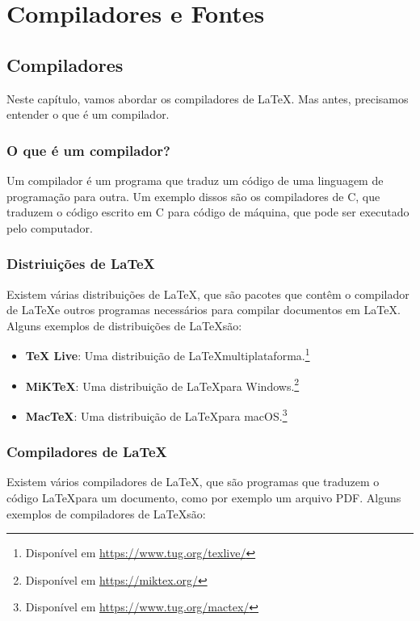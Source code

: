\chapter{Compiladores e Fontes}

\section{Compiladores}

Neste capítulo, vamos abordar os compiladores de \LaTeX. Mas antes, precisamos entender o que é um compilador.

\subsection{O que é um compilador?}

Um compilador é um programa que traduz um código de uma linguagem de programação para outra. Um exemplo dissos são os compiladores de C, que traduzem o código escrito em C para código de máquina, que pode ser executado pelo computador.

\subsection{Distriuições de \LaTeX}

Existem várias distribuições de \LaTeX, que são pacotes que contêm o compilador de \LaTeX e outros programas necessários para compilar documentos em \LaTeX. Alguns exemplos de distribuições de \LaTeX são:

\begin{itemize}
    \item \textbf{TeX Live}: Uma distribuição de \LaTeX multiplataforma.\footnote{Disponível em \url{https://www.tug.org/texlive/}}
    \item \textbf{MiKTeX}: Uma distribuição de \LaTeX para Windows.\footnote{Disponível em \url{https://miktex.org/}}
    \item \textbf{MacTeX}: Uma distribuição de \LaTeX para macOS.\footnote{Disponível em \url{https://www.tug.org/mactex/}}
\end{itemize}

\subsection{Compiladores de \LaTeX}

Existem vários compiladores de \LaTeX, que são programas que traduzem o código \LaTeX para um documento, como por exemplo um arquivo PDF. Alguns exemplos de compiladores de \LaTeX são:

